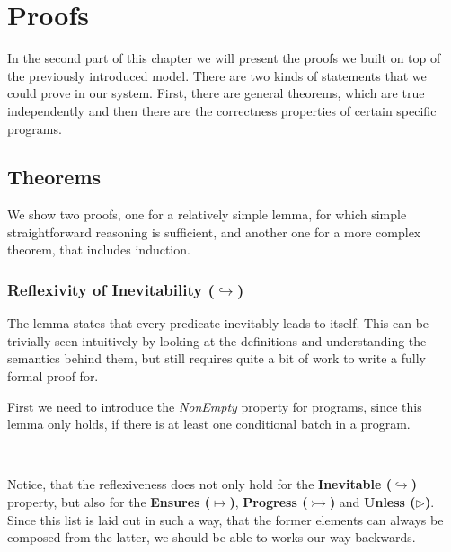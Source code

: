 \section{Proofs}

In the second part of this chapter we will present the proofs we built on top of the previously introduced model. There are two kinds of statements that we could prove in our system. First, there are general theorems, which are true independently and then there are the correctness properties of certain specific programs.

\subsection{Theorems}

We show two proofs, one for a relatively simple lemma, for which simple straightforward reasoning is sufficient, and another one for a more complex theorem, that includes induction.

\subsubsection{Reflexivity of Inevitability ($\hookrightarrow$)}

The lemma states that every predicate inevitably leads to itself. This can be trivially seen intuitively by looking at the definitions and understanding the semantics behind them, but still requires quite a bit of work to write a fully formal proof for. 

First we need to introduce the \textit{NonEmpty} property for programs, since this lemma only holds, if there is at least one conditional batch in a program.

\begin{code}
    \>[2]\AgdaSpace{}%
    \AgdaSymbol{:}\AgdaSpace{}%
    \AgdaSpace{}%
    \AgdaSpace{}%
    \<%
    \\
    \>[2]\AgdaSpace{}%
    \AgdaSpace{}%
    \AgdaSymbol{=}\AgdaSpace{}%
    \AgdaSpace{}%
    \AgdaSymbol{(}\AgdaSpace{}%
    \AgdaSpace{}%
    \AgdaInductiveConstructor{[]}\AgdaSymbol{)}\<%
\end{code}

Notice, that the reflexiveness does not only hold for the \textbf{Inevitable ($\hookrightarrow$)} property, but also for the \textbf{Ensures ($\mapsto$)}, \textbf{Progress ($\rightarrowtail$)} and \textbf{Unless ($\rhd$)}. Since this list is laid out in such a way, that the former elements can always be composed from the latter, we should be able to works our way backwards.

